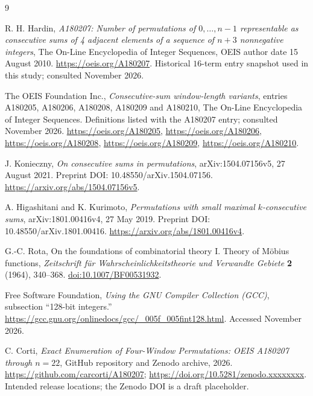 \documentclass[11pt]{article}
\theoremstyle{definition}
\theoremstyle{remark}
\begin{document}
\clearpage
\begin{thebibliography}{9}
\raggedright

R. H. Hardin,
\emph{A180207: Number of permutations of $0,\ldots,n-1$ representable as
consecutive sums of 4 adjacent elements of a sequence of $n+3$ nonnegative
integers}, The On-Line Encyclopedia of Integer Sequences,
OEIS author date 15 August 2010.
\url{https://oeis.org/A180207}.
Historical $16$-term entry snapshot used in this study; consulted
November 2026.

The OEIS Foundation Inc.,
\emph{Consecutive-sum window-length variants}, entries
A180205, A180206, A180208, A180209 and A180210,
The On-Line Encyclopedia of Integer Sequences.
Definitions listed with the A180207 entry; consulted November 2026.
\url{https://oeis.org/A180205},
\url{https://oeis.org/A180206},
\url{https://oeis.org/A180208},
\url{https://oeis.org/A180209},
\url{https://oeis.org/A180210}.

J. Konieczny,
\emph{On consecutive sums in permutations},
arXiv:1504.07156v5, 27 August 2021.
Preprint DOI: 10.48550/arXiv.1504.07156.
\url{https://arxiv.org/abs/1504.07156v5}.

A. Higashitani and K. Kurimoto,
\emph{Permutations with small maximal $k$-consecutive sums},
arXiv:1801.00416v4, 27 May 2019.
Preprint DOI: 10.48550/arXiv.1801.00416.
\url{https://arxiv.org/abs/1801.00416v4}.

G.-C. Rota,
On the foundations of combinatorial theory I. Theory of M\"obius functions,
\emph{Zeitschrift f\"ur Wahrscheinlichkeitstheorie und Verwandte Gebiete}
\textbf{2} (1964), 340--368.
\href{https://link.springer.com/article/10.1007/BF00531932}{doi:10.1007/BF00531932}.

Free Software Foundation,
\emph{Using the GNU Compiler Collection (GCC)}, subsection ``128-bit integers.''
\url{https://gcc.gnu.org/onlinedocs/gcc/_005f_005fint128.html}.
Accessed November 2026.

C. Corti,
\emph{Exact Enumeration of Four-Window Permutations: OEIS A180207 through
$n=22$}, GitHub repository and Zenodo archive, 2026.
\url{https://github.com/carcorti/A180207};
\url{https://doi.org/10.5281/zenodo.xxxxxxxx}.
Intended release locations; the Zenodo DOI is a draft placeholder.

\end{thebibliography}
\end{document}
